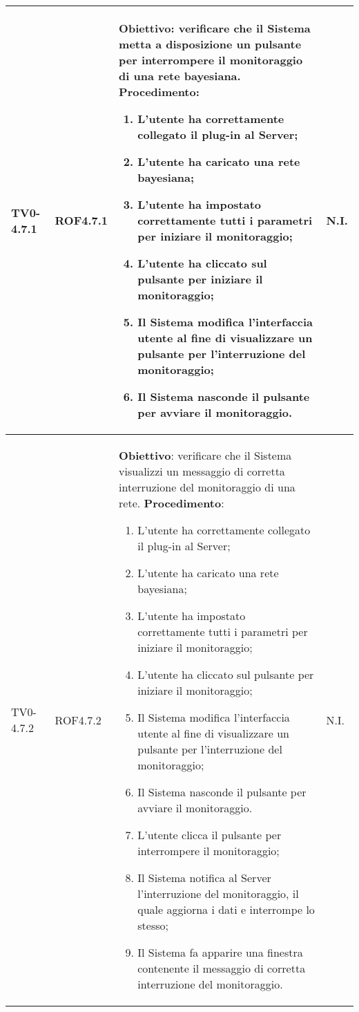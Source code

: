 \begin{longtable}{|C{.15\textwidth}|C{.13\textwidth}|m{.65\textwidth}|C{.08\textwidth}|}
TV0-4.7.1 & ROF4.7.1 &
	\textbf{Obiettivo}: verificare che il Sistema metta a disposizione un pulsante per interrompere il monitoraggio di una rete bayesiana. \newline
	\textbf{Procedimento}:
	\begin{enumerate}
		\item L'utente ha correttamente collegato il plug-in al Server;
		\item L'utente ha caricato una rete bayesiana;
		\item L'utente ha impostato correttamente tutti i parametri per iniziare il monitoraggio;
		\item L'utente ha cliccato sul pulsante per iniziare il monitoraggio;
		\item Il Sistema modifica l'interfaccia utente al fine di visualizzare un pulsante per l'interruzione del monitoraggio;
		\item Il Sistema nasconde il pulsante per avviare il monitoraggio.
	\end{enumerate}
	& N.I. \\
\hline

TV0-4.7.2 & ROF4.7.2 &
	\textbf{Obiettivo}: verificare che il Sistema visualizzi un messaggio di corretta interruzione del monitoraggio di una rete. \newline
	\textbf{Procedimento}:
	\begin{enumerate}
		\item L'utente ha correttamente collegato il plug-in al Server;
		\item L'utente ha caricato una rete bayesiana;
		\item L'utente ha impostato correttamente tutti i parametri per iniziare il monitoraggio;
		\item L'utente ha cliccato sul pulsante per iniziare il monitoraggio;
		\item Il Sistema modifica l'interfaccia utente al fine di visualizzare un pulsante per l'interruzione del monitoraggio;
		\item Il Sistema nasconde il pulsante per avviare il monitoraggio.
		\item L'utente clicca il pulsante per interrompere il monitoraggio;
		\item Il Sistema notifica al Server l'interruzione del monitoraggio, il quale aggiorna i dati e interrompe lo stesso;
		\item Il Sistema fa apparire una finestra contenente il messaggio di corretta interruzione del monitoraggio.
	\end{enumerate}
	& N.I. \\
\hline


\end{longtable}
